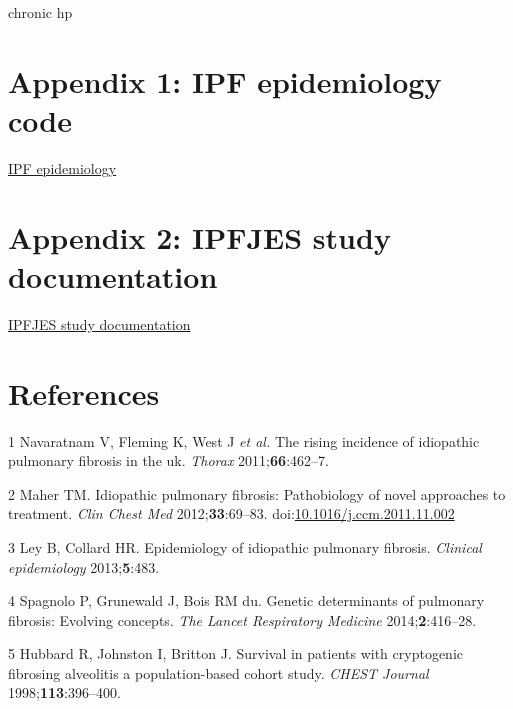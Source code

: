 \documentclass[12pt,a4paper,]{report}
\begin{document}
chronic hp

\hypertarget{appendix-1-ipf-epidemiology-code}{%
\chapter*{Appendix 1: IPF epidemiology
code}\label{appendix-1-ipf-epidemiology-code}}

\href{https://github.com/drcjar/pypf}{IPF epidemiology}

\hypertarget{appendix-2-ipfjes-study-documentation}{%
\chapter*{Appendix 2: IPFJES study
documentation}\label{appendix-2-ipfjes-study-documentation}}

\href{https://github.com/drcjar/ipfjes/}{IPFJES study documentation}

\footnotesize

\hypertarget{references}{%
\chapter*{References}\label{references}}

\hypertarget{refs}{}
\leavevmode\hypertarget{ref-Navaratnam2011}{}%
1 Navaratnam V, Fleming K, West J \emph{et al.} The rising incidence of
idiopathic pulmonary fibrosis in the uk. \emph{Thorax}
2011;\textbf{66}:462--7.

\leavevmode\hypertarget{ref-Maher2012}{}%
2 Maher TM. Idiopathic pulmonary fibrosis: Pathobiology of novel
approaches to treatment. \emph{Clin Chest Med} 2012;\textbf{33}:69--83.
doi:\href{https://doi.org/10.1016/j.ccm.2011.11.002}{10.1016/j.ccm.2011.11.002}

\leavevmode\hypertarget{ref-Ley2013}{}%
3 Ley B, Collard HR. Epidemiology of idiopathic pulmonary fibrosis.
\emph{Clinical epidemiology} 2013;\textbf{5}:483.

\leavevmode\hypertarget{ref-Spagnolo2014}{}%
4 Spagnolo P, Grunewald J, Bois RM du. Genetic determinants of pulmonary
fibrosis: Evolving concepts. \emph{The Lancet Respiratory Medicine}
2014;\textbf{2}:416--28.

\leavevmode\hypertarget{ref-Hubbard1998}{}%
5 Hubbard R, Johnston I, Britton J. Survival in patients with
cryptogenic fibrosing alveolitis a population-based cohort study.
\emph{CHEST Journal} 1998;\textbf{113}:396--400.
\end{document}

